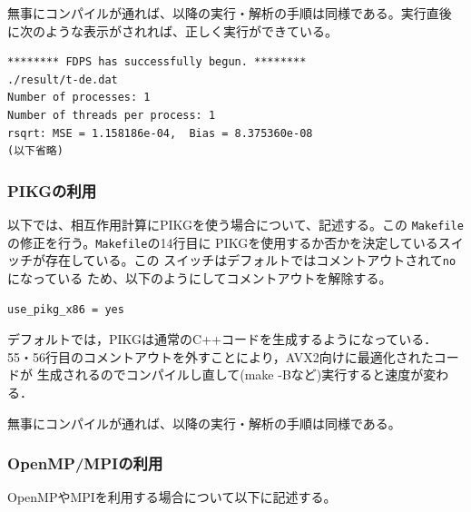 \documentclass[12pt,a4paper,dvipdfmx]{jarticle}
\begin{document}
無事にコンパイルが通れば、以降の実行・解析の手順は同様である。実行直後
に次のような表示がされれば、正しく実行ができている。
\begin{screen}
\begin{verbatim}
******** FDPS has successfully begun. ********
./result/t-de.dat
Number of processes: 1
Number of threads per process: 1
rsqrt: MSE = 1.158186e-04,  Bias = 8.375360e-08
(以下省略)
\end{verbatim}
\end{screen}

\subsubsection{PIKGの利用}

以下では、相互作用計算にPIKGを使う場合について、記述する。この
\texttt{Makefile}の修正を行う。\texttt{Makefile}の14行目に
PIKGを使用するか否かを決定しているスイッチが存在している。この
スイッチはデフォルトではコメントアウトされて\texttt{no}になっている
ため、以下のようにしてコメントアウトを解除する。
\begin{screen}
\begin{verbatim}
use_pikg_x86 = yes
\end{verbatim}
\end{screen}

デフォルトでは，PIKGは通常のC++コードを生成するようになっている．
55・56行目のコメントアウトを外すことにより，AVX2向けに最適化されたコードが
生成されるのでコンパイルし直して(make -Bなど)実行すると速度が変わる．

無事にコンパイルが通れば、以降の実行・解析の手順は同様である。

\subsubsection{OpenMP/MPIの利用}

OpenMPやMPIを利用する場合について以下に記述する。
\end{document}
